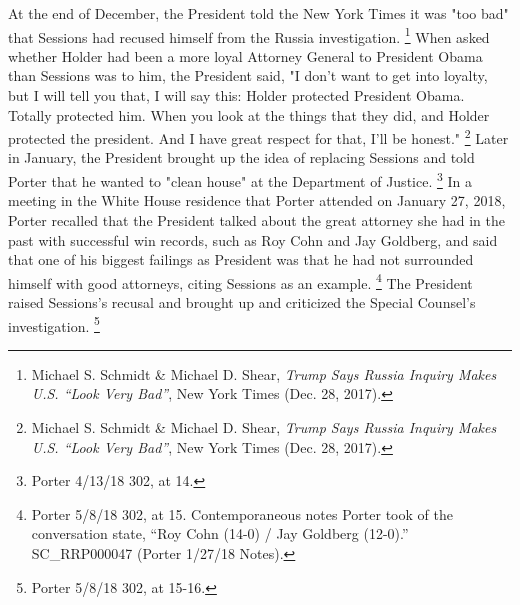 {At the end of December, the President told the New York Times it was "too bad" that Sessions had recused himself from the Russia investigation.%
\footnote{Michael S. Schmidt \& Michael D. Shear, \textit{Trump Says Russia Inquiry Makes U.S. ``Look Very Bad''}, New York Times (Dec. 28, 2017).}
When asked whether Holder had been a more loyal Attorney General to President Obama than Sessions was to him, the President said, "I don't want to get into loyalty, but I will tell you that, I will say this: Holder protected President Obama.
Totally protected him.
When you look at the things that they did, and Holder protected the president.
And I have great respect for that, I'll be honest."%
\footnote{Michael S. Schmidt \& Michael D. Shear, \textit{Trump Says Russia Inquiry Makes U.S. ``Look Very Bad''}, New York Times (Dec. 28, 2017).}
Later in January, the President brought up the idea of replacing Sessions and told Porter that he wanted to "clean house" at the Department of Justice.%
\footnote{Porter 4/13/18 302, at 14.}
In a meeting in the White House residence that Porter attended on January 27, 2018, Porter recalled that the President talked about the great attorney she had in the past with successful win records, such as Roy Cohn and Jay Goldberg, and said that one of his biggest failings as President was that he had not surrounded himself with good attorneys, citing Sessions as an example.%
\footnote{Porter 5/8/18 302, at 15.
Contemporaneous notes Porter took of the conversation state, “Roy Cohn (14-0) / Jay Goldberg (12-0).”
SC\_RRP000047 (Porter 1/27/18 Notes).}
The President raised Sessions's recusal and brought up and criticized the Special Counsel's investigation.%
\footnote{Porter 5/8/18 302, at 15-16.}

}
